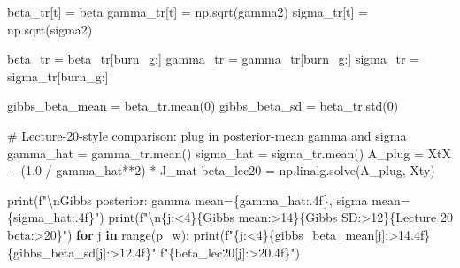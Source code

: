 \documentclass[
  letterpaper,
  DIV=11,
  numbers=noendperiod]{scrartcl}
\newenvironment{Shaded}{\begin{snugshade}}{\end{snugshade}}
\newcommand{\BuiltInTok}[1]{\textcolor[rgb]{0.00,0.23,0.31}{#1}}
\newcommand{\CharTok}[1]{\textcolor[rgb]{0.13,0.47,0.30}{#1}}
\newcommand{\CommentTok}[1]{\textcolor[rgb]{0.37,0.37,0.37}{#1}}
\newcommand{\ControlFlowTok}[1]{\textcolor[rgb]{0.00,0.23,0.31}{\textbf{#1}}}
\newcommand{\DecValTok}[1]{\textcolor[rgb]{0.68,0.00,0.00}{#1}}
\newcommand{\FloatTok}[1]{\textcolor[rgb]{0.68,0.00,0.00}{#1}}
\newcommand{\KeywordTok}[1]{\textcolor[rgb]{0.00,0.23,0.31}{\textbf{#1}}}
\newcommand{\NormalTok}[1]{\textcolor[rgb]{0.00,0.23,0.31}{#1}}
\newcommand{\OperatorTok}[1]{\textcolor[rgb]{0.37,0.37,0.37}{#1}}
\newcommand{\SpecialCharTok}[1]{\textcolor[rgb]{0.37,0.37,0.37}{#1}}
\newcommand{\SpecialStringTok}[1]{\textcolor[rgb]{0.13,0.47,0.30}{#1}}
\newcommand{\StringTok}[1]{\textcolor[rgb]{0.13,0.47,0.30}{#1}}
\begin{document}
\begin{Shaded}
\begin{Highlighting}[]
\NormalTok{    beta\_tr[t]  }\OperatorTok{=}\NormalTok{ beta}
\NormalTok{    gamma\_tr[t] }\OperatorTok{=}\NormalTok{ np.sqrt(gamma2)}
\NormalTok{    sigma\_tr[t] }\OperatorTok{=}\NormalTok{ np.sqrt(sigma2)}

\NormalTok{beta\_tr  }\OperatorTok{=}\NormalTok{ beta\_tr[burn\_g:]}
\NormalTok{gamma\_tr }\OperatorTok{=}\NormalTok{ gamma\_tr[burn\_g:]}
\NormalTok{sigma\_tr }\OperatorTok{=}\NormalTok{ sigma\_tr[burn\_g:]}

\NormalTok{gibbs\_beta\_mean }\OperatorTok{=}\NormalTok{ beta\_tr.mean(}\DecValTok{0}\NormalTok{)}
\NormalTok{gibbs\_beta\_sd   }\OperatorTok{=}\NormalTok{ beta\_tr.std(}\DecValTok{0}\NormalTok{)}

\CommentTok{\# Lecture{-}20{-}style comparison: plug in posterior{-}mean gamma and sigma}
\NormalTok{gamma\_hat }\OperatorTok{=}\NormalTok{ gamma\_tr.mean()}
\NormalTok{sigma\_hat }\OperatorTok{=}\NormalTok{ sigma\_tr.mean()}
\NormalTok{A\_plug    }\OperatorTok{=}\NormalTok{ XtX }\OperatorTok{+}\NormalTok{ (}\FloatTok{1.0} \OperatorTok{/}\NormalTok{ gamma\_hat}\OperatorTok{**}\DecValTok{2}\NormalTok{) }\OperatorTok{*}\NormalTok{ J\_mat}
\NormalTok{beta\_lec20 }\OperatorTok{=}\NormalTok{ np.linalg.solve(A\_plug, Xty)}

\BuiltInTok{print}\NormalTok{(}\SpecialStringTok{f"}\CharTok{\textbackslash{}n}\SpecialStringTok{Gibbs posterior: gamma mean=}\SpecialCharTok{\{}\NormalTok{gamma\_hat}\SpecialCharTok{:.4f\}}\SpecialStringTok{, sigma mean=}\SpecialCharTok{\{}\NormalTok{sigma\_hat}\SpecialCharTok{:.4f\}}\SpecialStringTok{"}\NormalTok{)}
\BuiltInTok{print}\NormalTok{(}\SpecialStringTok{f"}\CharTok{\textbackslash{}n}\SpecialCharTok{\{}\StringTok{\textquotesingle{}j\textquotesingle{}}\SpecialCharTok{:\textless{}4\}\{}\StringTok{\textquotesingle{}Gibbs mean\textquotesingle{}}\SpecialCharTok{:\textgreater{}14\}\{}\StringTok{\textquotesingle{}Gibbs SD\textquotesingle{}}\SpecialCharTok{:\textgreater{}12\}\{}\StringTok{\textquotesingle{}Lecture 20 beta\textquotesingle{}}\SpecialCharTok{:\textgreater{}20\}}\SpecialStringTok{"}\NormalTok{)}
\ControlFlowTok{for}\NormalTok{ j }\KeywordTok{in} \BuiltInTok{range}\NormalTok{(p\_w):}
    \BuiltInTok{print}\NormalTok{(}\SpecialStringTok{f"}\SpecialCharTok{\{}\NormalTok{j}\SpecialCharTok{:\textless{}4\}\{}\NormalTok{gibbs\_beta\_mean[j]}\SpecialCharTok{:\textgreater{}14.4f\}\{}\NormalTok{gibbs\_beta\_sd[j]}\SpecialCharTok{:\textgreater{}12.4f\}}\SpecialStringTok{"}
          \SpecialStringTok{f"}\SpecialCharTok{\{}\NormalTok{beta\_lec20[j]}\SpecialCharTok{:\textgreater{}20.4f\}}\SpecialStringTok{"}\NormalTok{)}


\end{Highlighting}
\end{Shaded}
\end{document}
